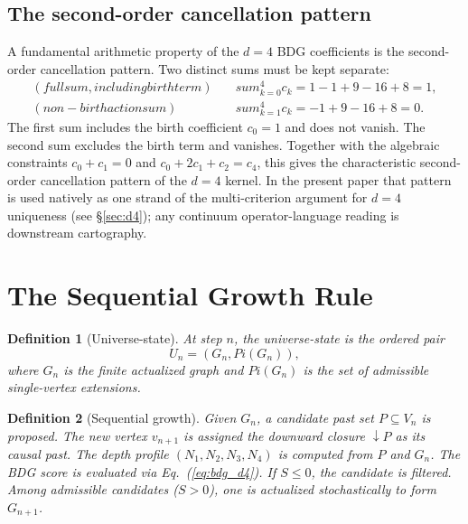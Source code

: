 \documentclass[11pt]{article}
\def\Pi{Pi}%
\def\text#1{#1}%
\def\sum{sum}%
\newtheorem{definition}{Definition}
\newcommand{\Pot}{\ensuremath{\Pi}}
\begin{document}
\subsection{The second-order cancellation pattern}

A fundamental arithmetic property of the $d=4$ BDG coefficients is the second-order cancellation pattern. Two distinct sums must be kept separate:
\begin{align}
\label{eq:full_sum}
\text{(full sum, including birth term)}\quad & \sum_{k=0}^{4} c_k = 1-1+9-16+8 = 1,\\
\label{eq:dalembert_sum}
\text{(non-birth action sum)}\quad & \sum_{k=1}^{4} c_k = -1+9-16+8 = 0.
\end{align}
The first sum includes the birth coefficient $c_0=1$ and does not vanish. The second sum excludes the birth term and vanishes. Together with the algebraic constraints $c_0+c_1=0$ and $c_0+2c_1+c_2=c_4$, this gives the characteristic second-order cancellation pattern of the $d=4$ kernel. In the present paper that pattern is used natively as one strand of the multi-criterion argument for $d=4$ uniqueness (see \S\ref{sec:d4}); any continuum operator-language reading is downstream cartography.

\section{The Sequential Growth Rule}
\label{sec:engine}

\begin{definition}[Universe-state]
At step $n$, the universe-state is the ordered pair
\begin{equation}
U_n=(G_n,\Pot(G_n)),
\end{equation}
where $G_n$ is the finite actualized graph and $\Pot(G_n)$ is the set of admissible single-vertex extensions.
\end{definition}

\begin{definition}[Sequential growth]
Given $G_n$, a candidate past set $P\subseteq V_n$ is proposed. The new vertex $v_{n+1}$ is assigned the downward closure $\downarrow\!P$ as its causal past. The depth profile $(N_1,N_2,N_3,N_4)$ is computed from $P$ and $G_n$. The BDG score is evaluated via Eq.~(\ref{eq:bdg_d4}). If $S\le 0$, the candidate is filtered. Among admissible candidates ($S>0$), one is actualized stochastically to form $G_{n+1}$.
\end{definition}
\end{document}
